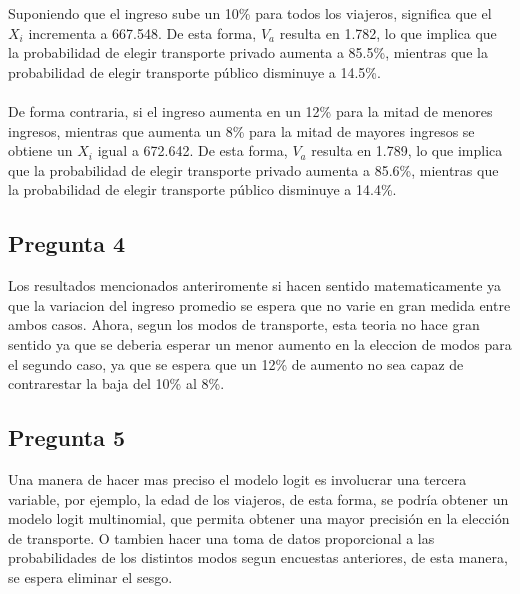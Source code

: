 Suponiendo que el ingreso sube un 10\% para todos los viajeros, significa que el $X_i$ incrementa a 667.548. De esta forma, $V_a$ resulta en 1.782, lo que implica que la probabilidad de elegir transporte privado aumenta a 85.5\%, mientras que la probabilidad de elegir transporte público disminuye a 14.5\%.
\\ \\
De forma contraria, si el ingreso aumenta en un 12\% para la mitad de menores ingresos, mientras que aumenta un 8\% para la mitad de mayores ingresos se obtiene un $X_i$ igual a 672.642. De esta forma, $V_a$ resulta en 1.789, lo que implica que la probabilidad de elegir transporte privado aumenta a 85.6\%, mientras que la probabilidad de elegir transporte público disminuye a 14.4\%.

\subsection{Pregunta 4}

Los resultados mencionados anteriromente si hacen sentido matematicamente ya que la variacion del ingreso promedio se espera que no varie en gran medida entre ambos casos. Ahora, segun los modos de transporte, esta teoria no hace gran sentido ya que se deberia esperar un menor aumento en la eleccion de modos para el segundo caso, ya que se espera que un 12\% de aumento no sea capaz de contrarestar la baja del 10\% al 8\%.

\subsection{Pregunta 5}

Una manera de hacer mas preciso el modelo logit es involucrar una tercera variable, por ejemplo, la edad de los viajeros, de esta forma, se podría obtener un modelo logit multinomial, que permita obtener una mayor precisión en la elección de transporte. O tambien hacer una toma de datos proporcional a las probabilidades de los distintos modos segun encuestas anteriores, de esta manera, se espera eliminar el sesgo.

